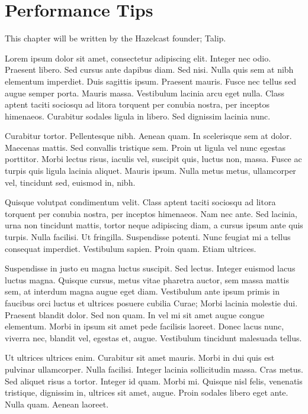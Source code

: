 \chapter{Performance Tips}

This chapter will be written by the Hazelcast founder; Talip.

Lorem ipsum dolor sit amet, consectetur adipiscing elit. Integer nec odio. Praesent libero. Sed cursus ante dapibus diam. Sed nisi. Nulla quis sem at nibh elementum imperdiet. Duis sagittis ipsum. Praesent mauris. Fusce nec tellus sed augue semper porta. Mauris massa. Vestibulum lacinia arcu eget nulla. Class aptent taciti sociosqu ad litora torquent per conubia nostra, per inceptos himenaeos. Curabitur sodales ligula in libero. Sed dignissim lacinia nunc. 

Curabitur tortor. Pellentesque nibh. Aenean quam. In scelerisque sem at dolor. Maecenas mattis. Sed convallis tristique sem. Proin ut ligula vel nunc egestas porttitor. Morbi lectus risus, iaculis vel, suscipit quis, luctus non, massa. Fusce ac turpis quis ligula lacinia aliquet. Mauris ipsum. Nulla metus metus, ullamcorper vel, tincidunt sed, euismod in, nibh. 

Quisque volutpat condimentum velit. Class aptent taciti sociosqu ad litora torquent per conubia nostra, per inceptos himenaeos. Nam nec ante. Sed lacinia, urna non tincidunt mattis, tortor neque adipiscing diam, a cursus ipsum ante quis turpis. Nulla facilisi. Ut fringilla. Suspendisse potenti. Nunc feugiat mi a tellus consequat imperdiet. Vestibulum sapien. Proin quam. Etiam ultrices. 

Suspendisse in justo eu magna luctus suscipit. Sed lectus. Integer euismod lacus luctus magna. Quisque cursus, metus vitae pharetra auctor, sem massa mattis sem, at interdum magna augue eget diam. Vestibulum ante ipsum primis in faucibus orci luctus et ultrices posuere cubilia Curae; Morbi lacinia molestie dui. Praesent blandit dolor. Sed non quam. In vel mi sit amet augue congue elementum. Morbi in ipsum sit amet pede facilisis laoreet. Donec lacus nunc, viverra nec, blandit vel, egestas et, augue. Vestibulum tincidunt malesuada tellus. 

Ut ultrices ultrices enim. Curabitur sit amet mauris. Morbi in dui quis est pulvinar ullamcorper. Nulla facilisi. Integer lacinia sollicitudin massa. Cras metus. Sed aliquet risus a tortor. Integer id quam. Morbi mi. Quisque nisl felis, venenatis tristique, dignissim in, ultrices sit amet, augue. Proin sodales libero eget ante. Nulla quam. Aenean laoreet. 

